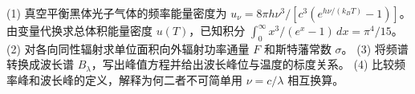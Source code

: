(1) 真空平衡黑体光子气体的频率能量密度为 \(u_\nu=8\pi h\nu^3/[c^3(e^{h\nu/(k_BT)}-1)]\)。由变量代换求总体积能量密度 \(u(T)\)，已知积分 \(\int_0^\infty x^3/(e^x-1)\,dx=\pi^4/15\)。
(2) 对各向同性辐射求单位面积向外辐射功率通量 \(F\) 和斯特藩常数 \(\sigma\)。
(3) 将频谱转换成波长谱 \(B_\lambda\)，写出峰值方程并给出波长峰位与温度的标度关系。
(4) 比较频率峰和波长峰的定义，解释为何二者不可简单用 \(\nu=c/\lambda\) 相互换算。
